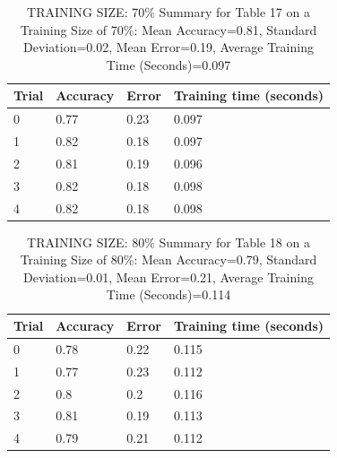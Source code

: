 \documentclass{article}
\begin{document}
\begin{table}[H]

\centering
{\begin{tabular}{||p{1cm}|p{1.8cm}|p{1.8cm}|p{3cm}||}
 \hline
Trial & Accuracy & Error & Training time (seconds) \\ [0.5ex] 
 \hline\hline
   0  & 0.77  & 0.23  & 0.097\\
\hline
   1  & 0.82  & 0.18  & 0.097\\
\hline
   2  & 0.81  & 0.19  & 0.096\\
\hline
   3  & 0.82  & 0.18  & 0.098\\
\hline
   4  & 0.82  & 0.18  & 0.098\\
\hline

\end{tabular}}
\caption{TRAINING SIZE: 70\% \newline Summary for Table 17 on a Training Size of 70\%: Mean Accuracy=0.81, Standard Deviation=0.02, Mean Error=0.19, Average Training Time (Seconds)=0.097}
\end{table} 

\begin{table}[H]

\centering
{\begin{tabular}{||p{1cm}|p{1.8cm}|p{1.8cm}|p{3cm}||}
 \hline
Trial & Accuracy & Error & Training time (seconds) \\ [0.5ex] 
 \hline\hline
   0  & 0.78  & 0.22  & 0.115\\
\hline
   1  & 0.77  & 0.23  & 0.112\\
\hline
   2  & 0.8  & 0.2  & 0.116\\
\hline
   3  & 0.81  & 0.19  & 0.113\\
\hline
   4  & 0.79  & 0.21  & 0.112\\
\hline

\end{tabular}}
\caption{TRAINING SIZE: 80\% \newline Summary for Table 18 on a Training Size of 80\%: Mean Accuracy=0.79, Standard Deviation=0.01, Mean Error=0.21, Average Training Time (Seconds)=0.114}
\end{table} 
\end{document}
